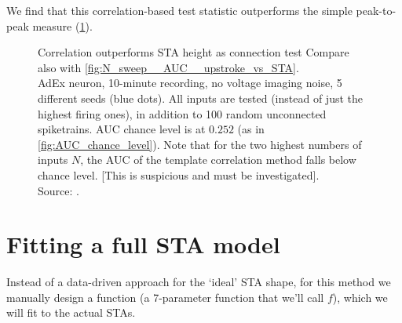 We find that this correlation-based test statistic outperforms the simple peak-to-peak measure (\cref{fig:N_sweep__AUC__template-corr_vs_STA}).

\begin{figure}
    \captionn
    {Correlation outperforms STA height as connection test}
    {Compare also with \cref{fig:N_sweep__AUC__upstroke_vs_STA}.\\
    AdEx neuron, 10-minute recording, no voltage imaging noise,  5 different seeds (blue dots). All inputs are tested (instead of just the highest firing ones), in addition to 100 random unconnected spiketrains. AUC chance level is at $0.252$ (as in \cref{fig:AUC_chance_level}). Note that for the two highest numbers of inputs $N$, the AUC of the template correlation method falls below chance level. [This is suspicious and must be investigated]. \\
    Source: .}
    \label{fig:N_sweep__AUC__template-corr_vs_STA}
\end{figure}



\FloatBarrier
\section{Fitting a full STA model}


Instead of a data-driven approach for the `ideal' STA shape, for this method we manually design a function (a 7-parameter function that we'll call $f$), which we will fit to the actual STAs.


